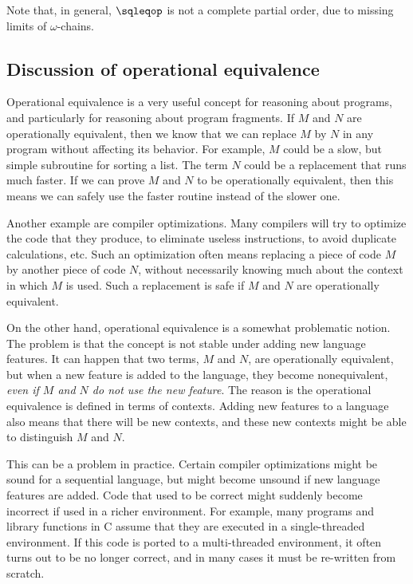 \documentclass[12pt]{article}
\begin{document}
Note that, in general, $\sqleqop$ is not a complete partial order, due
to missing limits of $\omega$-chains.

\subsection{Discussion of operational equivalence}

Operational equivalence is a very useful concept for reasoning about
programs, and particularly for reasoning about program fragments. If
$M$ and $N$ are operationally equivalent, then we know that we can
replace $M$ by $N$ in any program without affecting its behavior.  For
example, $M$ could be a slow, but simple subroutine for sorting a
list. The term $N$ could be a replacement that runs much faster. If we can
prove $M$ and $N$ to be operationally equivalent, then this means we
can safely use the faster routine instead of the slower one. 

Another example are compiler optimizations. Many compilers will try to
optimize the code that they produce, to eliminate useless
instructions, to avoid duplicate calculations, etc. Such an
optimization often means replacing a piece of code $M$ by another
piece of code $N$, without necessarily knowing much about the context
in which $M$ is used. Such a replacement is safe if $M$ and $N$ are
operationally equivalent. 

On the other hand, operational equivalence is a somewhat problematic
notion. The problem is that the concept is not stable under adding new
language features. It can happen that two terms, $M$ and $N$, are
operationally equivalent, but when a new feature is added to the
language, they become nonequivalent, {\em even if $M$ and $N$ do not
  use the new feature}. The reason is the operational equivalence is
defined in terms of contexts. Adding new features to a language also
means that there will be new contexts, and these new contexts might be
able to distinguish $M$ and $N$. 

This can be a problem in practice. Certain compiler optimizations
might be sound for a sequential language, but might become unsound if
new language features are added. Code that used to be correct might
suddenly become incorrect if used in a richer environment. For
example, many programs and library functions in C assume that they are
executed in a single-threaded environment. If this code is ported to a
multi-threaded environment, it often turns out to be no longer
correct, and in many cases it must be re-written from scratch. 
\end{document}
